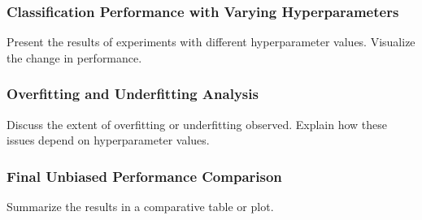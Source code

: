 \subsubsection{Classification Performance with Varying Hyperparameters}
Present the results of experiments with different hyperparameter values. Visualize the change in performance.
\subsubsection{Overfitting and Underfitting Analysis}
Discuss the extent of overfitting or underfitting observed. Explain how these issues depend on hyperparameter values.
\subsubsection{Final Unbiased Performance Comparison}
Summarize the results in a comparative table or plot.
